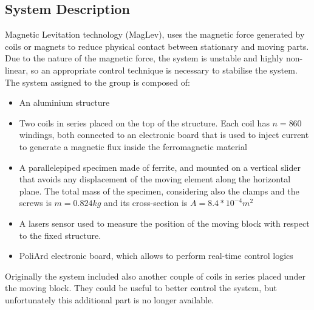 \documentclass[a4paper, 11pt] {article}
\begin{document}
\subsection{System Description}
Magnetic Levitation technology (MagLev), uses the magnetic force generated by coils or magnets to reduce physical contact between stationary and moving parts. Due to the nature of the magnetic force, the system is unstable and highly non-linear, so an appropriate control technique is necessary to stabilise the system. \\
The system assigned to the group is composed of: 
\begin{itemize}
\item An aluminium structure 
\item Two coils in series placed on the top of the structure. Each coil has $n = 860$ windings, both connected to an electronic board that is used to inject current to generate a magnetic flux inside the ferromagnetic material 
\item A parallelepiped specimen made of ferrite, and mounted on a vertical slider that avoids any displacement of the moving element along the horizontal plane. The total mass of the specimen, considering also the clamps and the screws is $m = 0.824 kg$ and its cross-section is $A = 8.4*10^{-4} m^{2}$
\item A lasers sensor used to measure the position of the moving block with respect to the fixed structure. 
\item     PoliArd electronic board, which allows to perform real-time control logics 
\end{itemize}

Originally the system included also another couple of coils in series placed under the moving block. They could be useful to better control the system, but unfortunately this additional part is no longer available. \\
\end{document}
